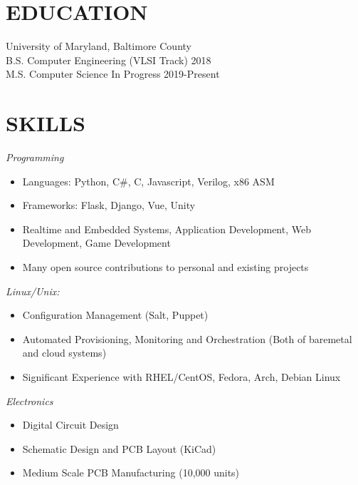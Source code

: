 \documentclass[line]{resume}
\begin{document}
\address{437 Sudbury Road, Linthicum, MD 21090}
\address{(240) 547-9517, mark@hackafe.net}

\begin{resume}
\section{EDUCATION}
University of Maryland, Baltimore County\\
B.S. Computer Engineering (VLSI Track) 2018\\
M.S. Computer Science In Progress 2019-Present

\section{SKILLS} {\sl Programming}
                \begin{itemize}
                \item Languages: Python, C\#, C, Javascript, Verilog, x86 ASM
                \item Frameworks: Flask, Django, Vue, Unity
                \item Realtime and Embedded Systems, Application Development, Web Development, Game Development
                \item Many open source contributions to personal and existing projects
                \end{itemize}
                {\sl Linux/Unix:}
                \begin{itemize}
                \item Configuration Management (Salt, Puppet)
                \item Automated Provisioning, Monitoring and Orchestration (Both of baremetal and cloud systems)
                \item Significant Experience with RHEL/CentOS, Fedora, Arch, Debian Linux
                \end{itemize}
                {\sl Electronics}
                \begin{itemize}
                \item Digital Circuit Design
                \item Schematic Design and PCB Layout (KiCad)
                \item Medium Scale PCB Manufacturing (10,000 units)
                \end{itemize}
 

\end{resume}
\end{document}

